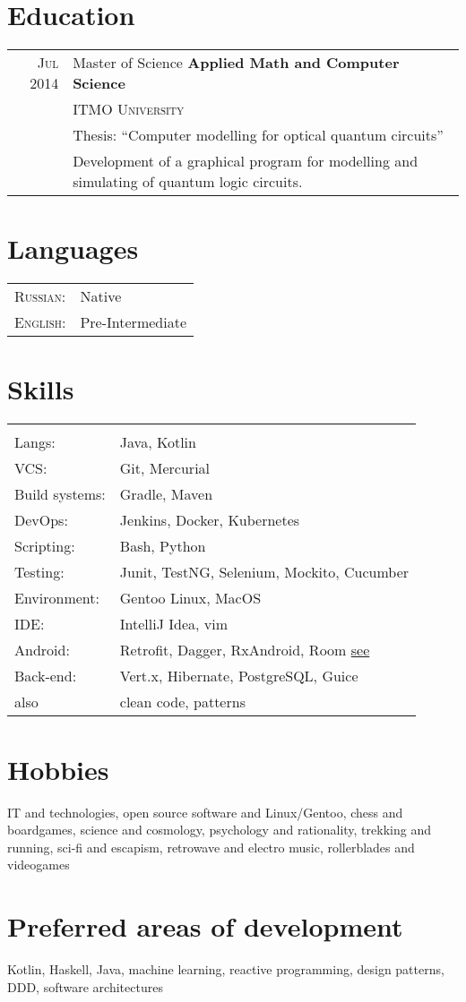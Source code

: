 \documentclass[a4paper,11pt]{article}
\begin{document}
\section{Education}
	\begin{tabular}{rl}	
	  \textsc{Jul 2014} & Master of Science \textbf{ Applied Math and Computer Science} \\& \textsc{ITMO University}\\
			& Thesis: ``Computer modelling for optical quantum circuits''\\&
			Development of a graphical program for modelling and simulating of quantum logic circuits.
	\end{tabular}

\section{Languages}
	\begin{tabular}{ll}
		\textsc{Russian:}&Native\\
		\textsc{English:}&Pre-Intermediate\\
	\end{tabular}

\section{Skills}
	\begin{tabular}{ll}
		\multicolumn{2}{c}{} \\
			Langs: 		& Java, Kotlin \\
			VCS: 		& Git, Mercurial \\
			Build systems: 	& Gradle, Maven \\
			DevOps:		& Jenkins, Docker, Kubernetes \\
			Scripting: 	& Bash, Python \\ 
			Testing: 	& Junit, TestNG, Selenium, Mockito, Cucumber\\
			Environment: 	& Gentoo Linux, MacOS \\
			IDE: 		& IntelliJ Idea, vim \\
			Android:	& Retrofit, Dagger, RxAndroid, Room \href{https://github.com/dbudyak/old_android_shit}{see} \\
			Back-end:	& Vert.x, Hibernate, PostgreSQL, Guice \\
			also 		& clean code, patterns \\
	\end{tabular}

\section{Hobbies}
	IT and technologies, open source software and Linux/Gentoo, chess and boardgames, science and cosmology, 
	psychology and rationality, trekking and running, sci-fi and escapism, retrowave and electro music, rollerblades and videogames

\section{Preferred areas of development}
	Kotlin, Haskell, Java, machine learning, reactive programming, design patterns, DDD, software architectures
	
\end{document}
